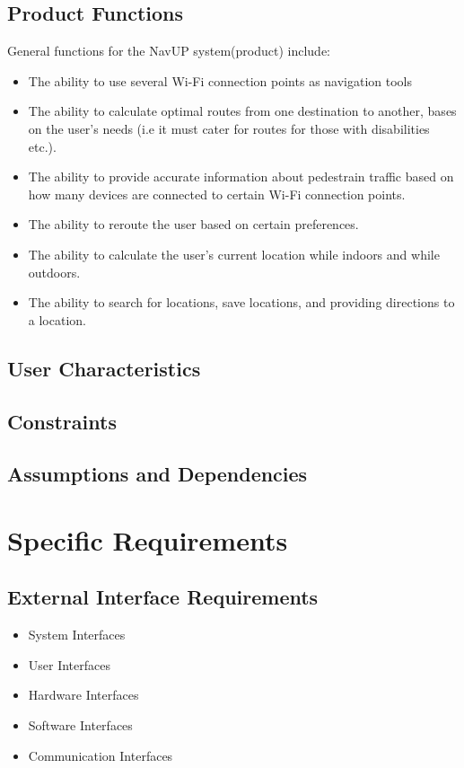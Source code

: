 \documentclass{article}
\begin{document}
    \subsection{Product Functions}
		\begin{flushleft}
			General functions for the NavUP system(product) include:
			\begin{itemize}
   		 	\item The ability to use several Wi-Fi connection points as navigation tools
			 	\item The ability to calculate optimal routes from one destination to another, bases on the user's needs (i.e it must cater for routes for those with disabilities etc.).
			 	\item The ability to provide accurate information about pedestrain traffic based on how many devices are connected to certain Wi-Fi connection points.
				 \item The ability to reroute the user based on certain preferences.
				 \item The ability to calculate the user's current location while indoors and while outdoors.
				 \item The ability to search for locations, save locations, and providing directions to a location. 
			\end{itemize}
		\end{flushleft}
    \subsection{User Characteristics}
    \subsection{Constraints}
    \subsection{Assumptions and Dependencies}
\section{Specific Requirements}
    \subsection{External Interface Requirements}
		\begin{itemize}
			\item System Interfaces
			\item User Interfaces
			\item Hardware Interfaces
			\item Software Interfaces
			\item Communication Interfaces
		\end{itemize}
\end{document}
